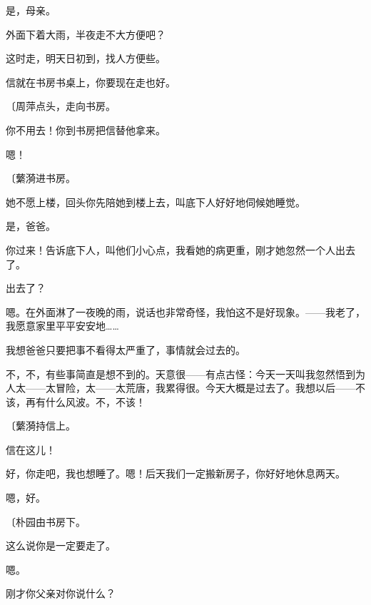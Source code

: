 是，母亲。

外面下着大雨，半夜走不大方便吧？

这时走，明天日初到，找人方便些。

信就在书房书桌上，你要现在走也好。

{\fangsong〔周萍点头，走向书房。}

你不用去！你到书房把信替他拿来。

嗯！

{\fangsong〔蘩漪进书房。}

她不愿上楼，回头你先陪她到楼上去，叫底下人好好地伺候她睡觉。

是，爸爸。

你过来！告诉底下人，叫他们小心点，我看她的病更重，刚才她忽然一个人出去了。

出去了？

嗯。在外面淋了一夜晚的雨，说话也非常奇怪，我怕这不是好现象。——我老了，我愿意家里平平安安地……

我想爸爸只要把事不看得太严重了，事情就会过去的。

不，不，有些事简直是想不到的。天意很——有点古怪：今天一天叫我忽然悟到为人太——太冒险，太——太荒唐，我累得很。今天大概是过去了。我想以后——不该，再有什么风波。不，不该！

{\fangsong〔蘩漪持信上。}

信在这儿！

好，你走吧，我也想睡了。嗯！后天我们一定搬新房子，你好好地休息两天。

嗯，好。

{\fangsong〔朴园由书房下。}

这么说你是一定要走了。

嗯。

刚才你父亲对你说什么？

